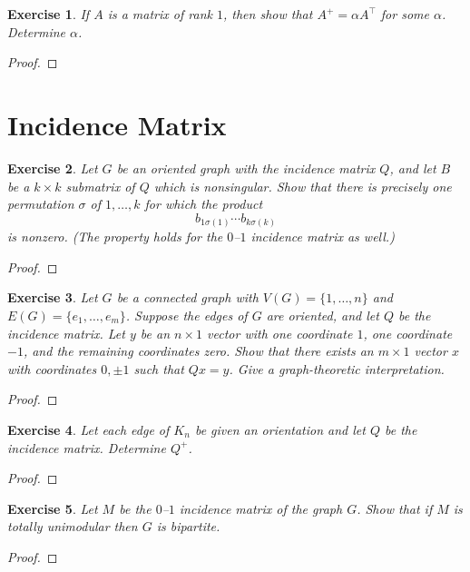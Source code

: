 \documentclass[11pt]{article}
\newtheorem{exercise}{Exercise}[section]
\theoremstyle{definition}
\begin{document}
\begin{exercise}
If $A$ is a matrix of rank $1$, then show that $A^{+}=\alpha A^\top$ for some $\alpha$.
Determine $\alpha$.
\end{exercise}
\begin{proof}
\end{proof}

\clearpage
\section{Incidence Matrix}

\begin{exercise}
Let $G$ be an oriented graph with the incidence matrix $Q$, and let $B$ be a $k\times k$
submatrix of $Q$ which is nonsingular. Show that there is precisely one permutation
$\sigma$ of $1,\ldots,k$ for which the product
\[
b_{1\sigma(1)}\cdots b_{k\sigma(k)}
\]
is nonzero. (The property holds for the $0$--$1$ incidence matrix as well.)
\end{exercise}
\begin{proof}
\end{proof}

\begin{exercise}
Let $G$ be a connected graph with $V(G)=\{1,\ldots,n\}$ and $E(G)=\{e_1,\ldots,e_m\}$.
Suppose the edges of $G$ are oriented, and let $Q$ be the incidence matrix. Let $y$ be an
$n\times 1$ vector with one coordinate $1$, one coordinate $-1$, and the remaining
coordinates zero. Show that there exists an $m\times 1$ vector $x$ with coordinates
$0,\pm1$ such that $Qx=y$. Give a graph-theoretic interpretation.
\end{exercise}
\begin{proof}
\end{proof}

\begin{exercise}
Let each edge of $K_n$ be given an orientation and let $Q$ be the incidence matrix.
Determine $Q^{+}$.
\end{exercise}
\begin{proof}
\end{proof}

\begin{exercise}
Let $M$ be the $0$--$1$ incidence matrix of the graph $G$. Show that if $M$ is totally
unimodular then $G$ is bipartite.
\end{exercise}
\begin{proof}
\end{proof}
\end{document}
